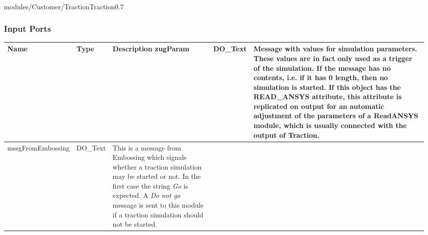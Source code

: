 \begin{htmlonly}
%
\begin{covimg2}{modules/Customer/Traction}{Traction}{0.7}\end{covimg2}



%
%

%
%




%
\subsubsection{Input Ports}
%


\begin{longtable}{|p{3.5cm}|p{4cm}|p{7cm}|}
\hline
   \bf{Name} & \bf{Type} & \bf{Description} \endhead
\hline\hline
	\textcolor{required}{zugParam} & DO\_Text & Message with
                 values for simulation parameters. These values
                 are in fact only used as a trigger of the simulation.
                 If the message has no contents, i.e. if it has 0 length, 
                 then no simulation is started. If this object has
                 the READ\_ANSYS attribute, this attribute is replicated
                 on output for an automatic adjustment of the parameters
                 of a ReadANSYS module, which is usually connected with
                 the output of Traction.\\
\hline
	\textcolor{required}{mssgFromEmbossing} & DO\_Text
				       & This is a message from Embossing
                    which signals whether a traction simulation may be started
                    or not. In the first case the string {\sl Go} is expected.
                    A {\sl Do not go} message is sent to this module if 
                    a traction simulation should not be started. \\
                     

\end{longtable}
\end{htmlonly}
